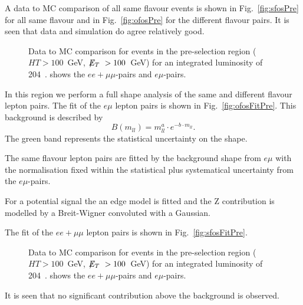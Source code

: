 A data to MC comparison of all same flavour events
is shown in Fig.~\ref{fig:sfosPre} for all same flavour
and in Fig.~\ref{fig:ofosPre} for the different flavour
pairs. It is seen that data and simulation do agree relatively good.

\begin{figure}[hbtp]
  \hfill
  \hfill
  \caption{Data to MC comparison for events in the pre-selection region ($HT>100$~GeV, $\displaystyle{\not} E_T~> 100$~GeV)
  for an integrated luminosity of 204~\pbi.  shows the $ee+\mu\mu$-pairs and
  $e\mu$-pairs.}
\end{figure}

In this region we perform a full shape analysis
of the same and different flavour lepton pairs.
The fit of the $e\mu$ lepton pairs is shown
in Fig.~\ref{fig:ofosFitPre}.
This background is described by 
\begin{equation}\label{eq:fit_bkg}
B(m_{ll}) = m_{ll}^{a} \cdot e^{-b\cdot m_{ll}}.
\end{equation}
The green band represents the statistical 
uncertainty on the shape.

The same flavour lepton pairs are fitted
by the background shape from $e\mu$
with the normalisation fixed within the 
statistical plus systematical uncertainty
from the $e\mu$-pairs.

For a potential signal the an edge model
is fitted and the Z contribution
is modelled by a Breit-Wigner convoluted 
with a Gaussian.

The fit of the $ee+\mu\mu$ lepton pairs is shown
in Fig.~\ref{fig:sfosFitPre}.

\begin{figure}[hbtp]
  \hfill
  \hfill
  \caption{Data to MC comparison for events in the pre-selection region ($HT>100$~GeV, $\displaystyle{\not} E_T~> 100$~GeV)
  for an integrated luminosity of 204~\pbi.  shows the $ee+\mu\mu$-pairs and
  $e\mu$-pairs.}
\end{figure}

It is seen that no significant contribution
above the background is observed.
